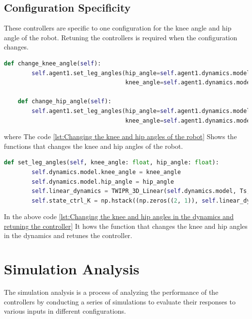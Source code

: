 \subsection{Configuration Specificity}
These controllers are specific to one configuration for the knee angle and hip angle of the robot.
Retuning the controllers is required when the configuration changes.
\begin{lstlisting}[language=Python, caption=Changing the knee and hip angles of the robot, label={lst:Changing the knee and hip angles of the robot}]
    def change_knee_angle(self):
        self.agent1.set_leg_angles(hip_angle=self.agent1.dynamics.model.hip_angle,
                                   knee_angle=self.agent1.dynamics.model.knee_angle + deg2rad(5))

    def change_hip_angle(self):
        self.agent1.set_leg_angles(hip_angle=self.agent1.dynamics.model.hip_angle + deg2rad(5),
                                   knee_angle=self.agent1.dynamics.model.knee_angle)
\end{lstlisting}
where The code \ref{lst:Changing the knee and hip angles of the robot} Shows the functions that changes the knee and hip angles of the robot.
\begin{lstlisting}[language=Python, caption=Changing the knee and hip angles in the dynamics and retuning the controller, label={lst:Changing the knee and hip angles in the dynamics and retuning the controller}]
    def set_leg_angles(self, knee_angle: float, hip_angle: float):
        self.dynamics.model.knee_angle = knee_angle
        self.dynamics.model.hip_angle = hip_angle
        self.linear_dynamics = TWIPR_3D_Linear(self.dynamics.model, Ts, self.poles, self.eigenvectors)
        self.state_ctrl_K = np.hstack((np.zeros((2, 1)), self.linear_dynamics.K))
\end{lstlisting}
In the above code \ref{lst:Changing the knee and hip angles in the dynamics and retuning the controller} It hows the function that changes the knee and hip angles in the dynamics and retunes the controller.


\section{Simulation Analysis}
The simulation analysis is a process of analyzing the performance of the controllers by conducting a series of simulations to evaluate their responses to various inputs in different configurations.
